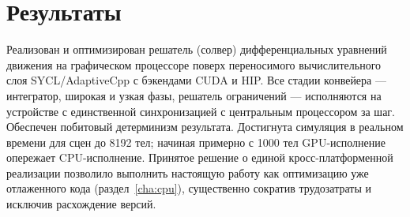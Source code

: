 \section{Результаты}

Реализован и оптимизирован решатель (солвер) дифференциальных уравнений
движения на графическом процессоре поверх переносимого вычислительного слоя
SYCL/AdaptiveCpp с бэкендами CUDA и HIP. Все стадии конвейера --- интегратор,
широкая и узкая фазы, решатель ограничений --- исполняются на устройстве с
единственной синхронизацией с центральным процессором за шаг. Обеспечен
побитовый детерминизм результата. Достигнута симуляция в реальном времени для
сцен до 8192 тел; начиная примерно с 1000 тел GPU-исполнение опережает
CPU-исполнение. Принятое решение о единой кросс-платформенной реализации
позволило выполнить настоящую работу как оптимизацию уже отлаженного кода
(раздел~\ref{cha:cpu}), существенно сократив трудозатраты и исключив
расхождение версий.
